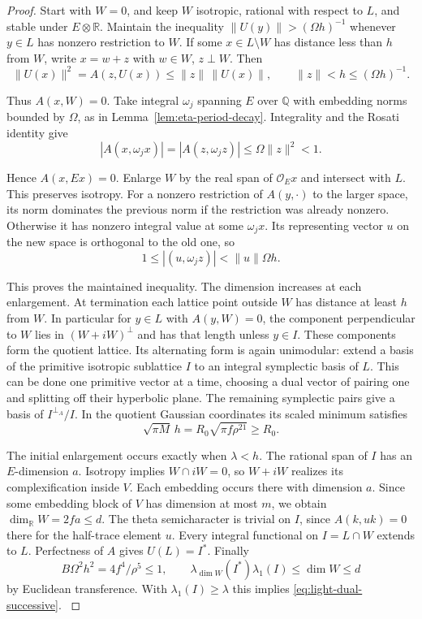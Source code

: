 \begin{proof}
Start with \(W=0\), and keep \(W\) isotropic, rational with
respect to \(L\), and stable under \(E\otimes\mathbb R\).
Maintain the inequality \(\|U(y)\|>(\Omega h)^{-1}\) whenever
\(y\in L\) has nonzero restriction to \(W\). If some
\(x\in L\setminus W\) has distance less than \(h\) from \(W\),
write \(x=w+z\) with \(w\in W\), \(z\perp W\). Then
\[
 \|U(x)\|^2=A(z,U(x))\le\|z\|\,\|U(x)\|,
 \qquad \|z\|<h\le(\Omega h)^{-1}.
\]

Thus \(A(x,W)=0\). Take integral \(\omega_j\) spanning \(E\)
over \(\mathbb Q\) with embedding norms bounded by \(\Omega\), as in
Lemma~\ref{lem:eta-period-decay}. Integrality and the Rosati
identity give
\[
 |A(x,\omega_jx)|=|A(z,\omega_jz)|\le\Omega\|z\|^2<1.
\]

Hence \(A(x,Ex)=0\). Enlarge \(W\) by the real span of
\(\mathcal O_E x\) and intersect with \(L\). This preserves
isotropy. For a nonzero restriction of \(A(y,\cdot)\) to the
larger space, its norm dominates the previous norm if the
restriction was already nonzero. Otherwise it has nonzero integral
value at some \(\omega_jx\). Its representing vector \(u\) on the
new space is orthogonal to the old one, so
\[
       1\le |(u,\omega_j z)|<\|u\|\Omega h .
\]

This proves the maintained inequality. The dimension increases at
each enlargement. At termination each lattice point outside \(W\)
has distance at least \(h\) from \(W\). In particular for
\(y\in L\) with \(A(y,W)=0\), the component perpendicular
to \(W\) lies in \((W+iW)^\perp\) and has that length unless
\(y\in I\). These components form the quotient lattice. Its alternating
form is again unimodular: extend a basis of the primitive
isotropic sublattice \(I\) to an integral symplectic basis of \(L\).
This can be done one primitive vector at a time, choosing a dual
vector of pairing one and splitting off their hyperbolic plane.
The remaining symplectic pairs give a basis of \(I^{\perp_A}/I\).
In the quotient Gaussian coordinates its scaled minimum satisfies
\[
     \sqrt{\pi M}\,h=R_0\sqrt{\pi f\rho^{21}}\ge R_0 .
\]


The initial enlargement occurs exactly when \(\lambda<h\).
The rational span of \(I\) has an \(E\)-dimension \(a\).
Isotropy implies \(W\cap iW=0\), so \(W+iW\) realizes its
complexification inside \(V\). Each embedding occurs there with
dimension \(a\). Since some embedding block of \(V\) has
dimension at most \(m\), we obtain \(\dim_{\mathbb R}W=2fa\le d\).
The theta semicharacter is trivial on \(I\), since
\(A(k,uk)=0\) there for the half-trace element \(u\).
Every integral functional on \(I=L\cap W\) extends to \(L\).
Perfectness of \(A\) gives \(U(L)=I^*\).
Finally
\[
  B\Omega^2h^2=4f^4/\rho^5\le1,\qquad
  \lambda_{\dim W}(I^*)\lambda_1(I)\le\dim W\le d
\]
by Euclidean transference. With \(\lambda_1(I)\ge\lambda\) this
implies \eqref{eq:light-dual-successive}. \cite{banaszczyk}
\end{proof}

